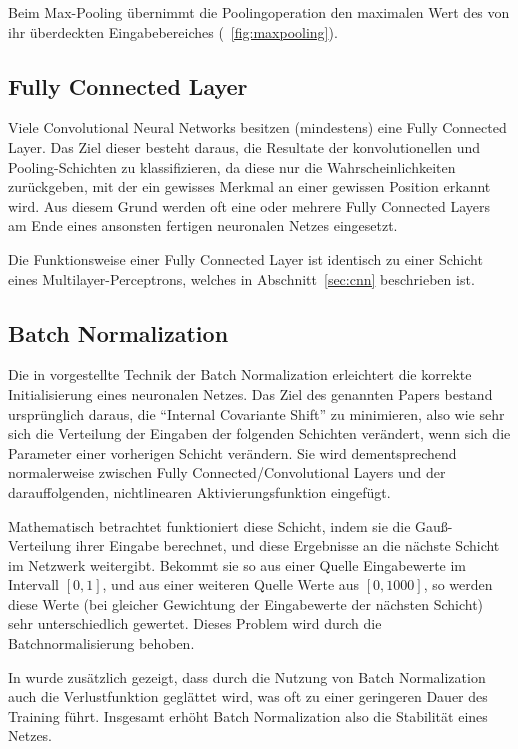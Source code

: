 Beim Max-Pooling übernimmt die Poolingoperation den maximalen Wert des von ihr überdeckten Eingabebereiches (\vgl \figurename~\ref{fig:maxpooling}).

\subsection{Fully Connected Layer}
\label{ssec:fully_connected_layer}
Viele Convolutional Neural Networks besitzen (mindestens) eine Fully Connected Layer. Das Ziel dieser besteht daraus, die Resultate der konvolutionellen und Pooling-Schichten zu klassifizieren, da diese nur die Wahrscheinlichkeiten zurückgeben, mit der ein gewisses Merkmal an einer gewissen Position erkannt wird. Aus diesem Grund werden oft eine oder mehrere Fully Connected Layers am Ende eines ansonsten fertigen neuronalen Netzes eingesetzt. \cite{geva}

Die Funktionsweise einer Fully Connected Layer ist identisch zu einer Schicht eines Multilayer-Perceptrons, welches in Abschnitt~\ref{sec:cnn} beschrieben ist.

\subsection{Batch Normalization}
\label{ssec:bn}

Die in \cite{ioffe_15} vorgestellte Technik der Batch Normalization erleichtert die korrekte Initialisierung eines neuronalen Netzes. Das Ziel des genannten Papers bestand ursprünglich daraus, die \enquote{Internal Covariante Shift} zu minimieren, also wie sehr sich die Verteilung der Eingaben der folgenden Schichten verändert, wenn sich die Parameter einer vorherigen Schicht verändern. Sie wird dementsprechend normalerweise zwischen Fully Connected/Convolutional Layers und der darauffolgenden, nichtlinearen Aktivierungsfunktion eingefügt. \cite{cs231n}

Mathematisch betrachtet funktioniert diese Schicht, indem sie die Gauß-Verteilung ihrer Eingabe berechnet, und diese Ergebnisse an die nächste Schicht im Netzwerk weitergibt. \cite{cs231n} Bekommt sie so \bspw aus einer Quelle Eingabewerte im Intervall $\left[0, 1\right]$, und aus einer weiteren Quelle Werte aus $\left[0, 1000\right]$, so werden diese Werte (bei gleicher Gewichtung der Eingabewerte der nächsten Schicht) sehr unterschiedlich gewertet. Dieses Problem wird durch die Batchnormalisierung behoben.

In \cite{santurkar_18} wurde zusätzlich gezeigt, dass durch die Nutzung von Batch Normalization auch die Verlustfunktion geglättet wird, was oft zu einer geringeren Dauer des Training führt. Insgesamt erhöht Batch Normalization also die Stabilität eines Netzes.

